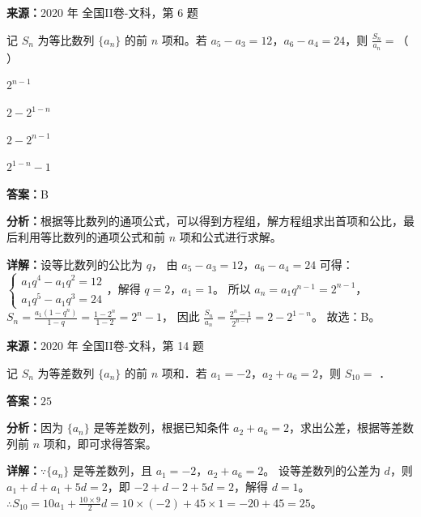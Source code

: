 \begin{question}[points=5]
\textbf{来源：}2020 年 全国II卷-文科，第 6 题\par
记 $S_n$ 为等比数列 $\{a_n\}$ 的前 $n$ 项和。若 $a_5-a_3=12$，$a_6-a_4=24$，则 $\frac{S_n}{a_n}=$（ ）
\begin{choices}
  \item $2^{n-1}$
  \item $2-2^{1-n}$
  \item $2-2^{n-1}$
  \item $2^{1-n}-1$
\end{choices}
\begin{solution}
\textbf{答案：}B

\textbf{分析：}根据等比数列的通项公式，可以得到方程组，解方程组求出首项和公比，最后利用等比数列的通项公式和前 $n$ 项和公式进行求解。

\textbf{详解：}设等比数列的公比为 $q$，
由 $a_5-a_3=12$，$a_6-a_4=24$ 可得：
$\begin{cases} a_1 q^4 - a_1 q^2 =12 \\ a_1 q^5 - a_1 q^3 =24 \end{cases}$，解得 $q=2$，$a_1=1$。
所以 $a_n = a_1 q^{n-1}=2^{n-1}$，$S_n = \frac{a_1(1-q^n)}{1-q} = \frac{1-2^n}{1-2}=2^n-1$，
因此 $\frac{S_n}{a_n} = \frac{2^n-1}{2^{n-1}} = 2 - 2^{1-n}$。
故选：B。
\end{solution}
\end{question}

\begin{question}[points=5]
\textbf{来源：}2020 年 全国II卷-文科，第 14 题\par
记 $S_n$ 为等差数列 $\{a_n\}$ 的前 $n$ 项和．若 $a_1=-2$，$a_2+a_6=2$，则 $S_{10}=$ ．
\fillin[{$25$}]
\begin{solution}
\textbf{答案：}$25$

\textbf{分析：}因为 $\{a_n\}$ 是等差数列，根据已知条件 $a_2+a_6=2$，求出公差，根据等差数列前 $n$ 项和，即可求得答案。

\textbf{详解：}$\because \{a_n\}$ 是等差数列，且 $a_1=-2$，$a_2+a_6=2$。
设等差数列的公差为 $d$，则 $a_1+d+a_1+5d=2$，即 $-2+d-2+5d=2$，解得 $d=1$。
$\therefore S_{10} = 10a_1 + \frac{10\times9}{2}d = 10\times(-2) + 45\times1 = -20+45=25$。
\end{solution}
\end{question}

